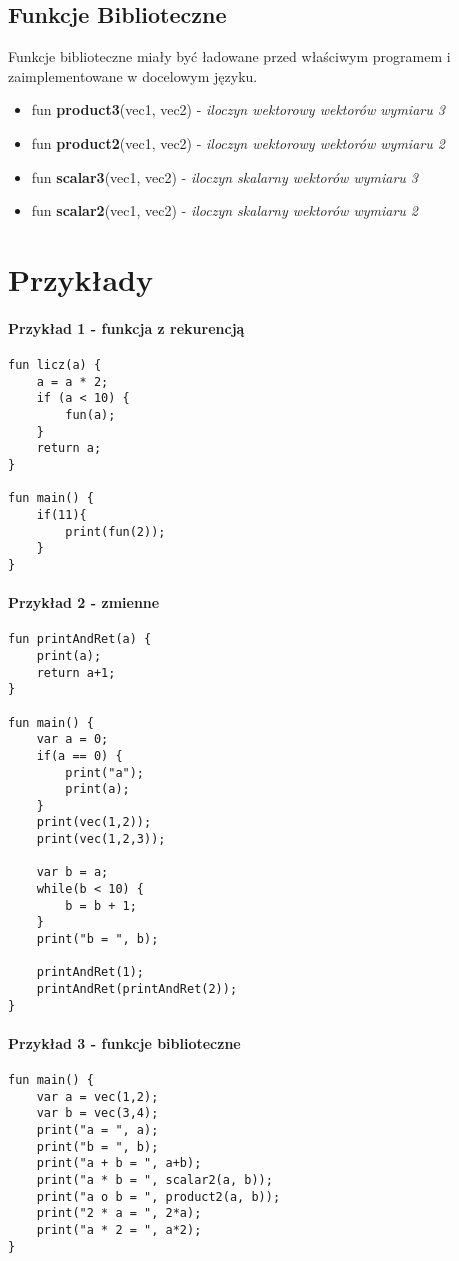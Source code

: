 \documentclass[11pt]{article} %
\begin{document}
\subsection{Funkcje Biblioteczne}
Funkcje biblioteczne miały być ładowane przed właściwym programem i zaimplementowane w docelowym języku. 
\begin{itemize}
	\item fun \textbf{product3}(vec1, vec2) - \textit{iloczyn wektorowy wektorów wymiaru 3}
	\item fun \textbf{product2}(vec1, vec2) - \textit{iloczyn wektorowy wektorów wymiaru 2}
	\item fun \textbf{scalar3}(vec1, vec2) - \textit{iloczyn skalarny wektorów wymiaru 3}
	\item fun \textbf{scalar2}(vec1, vec2) - \textit{iloczyn skalarny wektorów wymiaru 2}
\end{itemize}

\section{Przykłady}

\paragraph{Przykład 1 - funkcja z rekurencją}
\begin{verbatim}
fun licz(a) {
    a = a * 2;
    if (a < 10) {
        fun(a);
    }
    return a;
}  				

fun main() {
    if(11){
        print(fun(2));
    }
}					
\end{verbatim}

\paragraph{Przykład 2 - zmienne}
\begin{verbatim}
fun printAndRet(a) {
    print(a);
    return a+1;
}

fun main() {
    var a = 0;
    if(a == 0) {
        print("a");
        print(a);
    }
    print(vec(1,2));
    print(vec(1,2,3));

    var b = a;
    while(b < 10) {
        b = b + 1;
    }
    print("b = ", b);

    printAndRet(1);
    printAndRet(printAndRet(2));
}   
\end{verbatim}

\paragraph{Przykład 3 - funkcje biblioteczne}
\begin{verbatim}
fun main() {
    var a = vec(1,2);
    var b = vec(3,4);
    print("a = ", a);
    print("b = ", b);
    print("a + b = ", a+b);
    print("a * b = ", scalar2(a, b));
    print("a o b = ", product2(a, b));
    print("2 * a = ", 2*a);
    print("a * 2 = ", a*2);
}
\end{verbatim}
\end{document}

